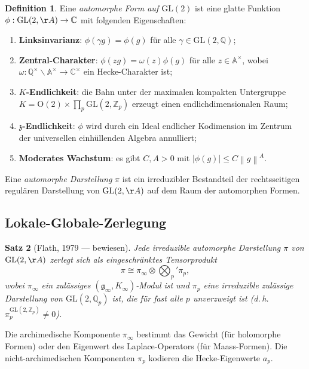 \documentclass[12pt,a4paper]{amsart}
\newtheorem{theorem}{Satz}[section]
\theoremstyle{definition}
\newtheorem{definition}[theorem]{Definition}
\newcommand{\ZZ}{\mathbb{Z}}
\newcommand{\QQ}{\mathbb{Q}}
\newcommand{\CC}{\mathbb{C}}
\newcommand{\AAring}{\mathbb{A}}
\newcommand{\GL}{\mathrm{GL}}
\newcommand{\norm}[1]{\left\|#1\right\|}
\begin{document}
\begin{definition}
Eine \emph{automorphe Form auf $\GL(2)$} ist eine glatte Funktion
$\phi: \GL(2,\AA) \to \CC$ mit folgenden Eigenschaften:
\begin{enumerate}[label=(\roman*)]
\item \textbf{Linksinvarianz}: $\phi(\gamma g) = \phi(g)$ für alle $\gamma \in \GL(2,\QQ)$;
\item \textbf{Zentral-Charakter}: $\phi(zg) = \omega(z)\phi(g)$ für alle $z \in \AAring^\times$,
  wobei $\omega: \QQ^\times \backslash \AAring^\times \to \CC^\times$ ein Hecke-Charakter ist;
\item \textbf{$K$-Endlichkeit}: die Bahn unter der maximalen kompakten Untergruppe
  $K = \mathrm{O}(2) \times \prod_p \GL(2,\ZZ_p)$ erzeugt einen endlichdimensionalen Raum;
\item \textbf{$\mathfrak{z}$-Endlichkeit}: $\phi$ wird durch ein Ideal endlicher Kodimension
  im Zentrum der universellen einhüllenden Algebra annulliert;
\item \textbf{Moderates Wachstum}: es gibt $C, A > 0$ mit $|\phi(g)| \leq C \norm{g}^A$.
\end{enumerate}
\end{definition}

Eine \emph{automorphe Darstellung} $\pi$ ist ein irreduzibler Bestandteil der
rechtsseitigen regulären Darstellung von $\GL(2,\AA)$ auf dem Raum der automorphen Formen.

\subsection{Lokale-Globale-Zerlegung}

\begin{theorem}[Flath, 1979 — bewiesen]
Jede irreduzible automorphe Darstellung $\pi$ von $\GL(2,\AA)$ zerlegt sich als
eingeschränktes Tensorprodukt
\[
\pi \cong \pi_\infty \otimes \bigotimes_p' \pi_p,
\]
wobei $\pi_\infty$ ein zulässiges $(\mathfrak{g}_\infty, K_\infty)$-Modul ist und
$\pi_p$ eine irreduzible zulässige Darstellung von $\GL(2,\QQ_p)$ ist, die für
fast alle $p$ unverzweigt ist (d.\,h.\ $\pi_p^{\GL(2,\ZZ_p)} \neq 0$).
\end{theorem}

Die archimedische Komponente $\pi_\infty$ bestimmt das Gewicht (für holomorphe Formen)
oder den Eigenwert des Laplace-Operators (für Maass-Formen). Die nicht-archimedischen
Komponenten $\pi_p$ kodieren die Hecke-Eigenwerte $a_p$.
\end{document}
